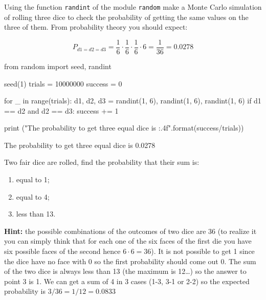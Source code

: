 \begin{question}
Using the function \texttt{randint} of the module \texttt{random} make a Monte Carlo simulation of rolling three dice to check the probability of getting the same values on the three of them.
From probability theory you should expect:

\[P_{d1=d2=d3} = \frac{1}{6}\cdot\frac{1}{6}\cdot\frac{1}{6}\cdot 6 = \frac{1}{36} = 0.0278\]
\end{question}

\cprotEnv\begin{solution}
\begin{ipython}
from random import seed, randint

seed(1)
trials = 10000000
success = 0

for _ in range(trials):
    d1, d2, d3 = randint(1, 6), randint(1, 6), randint(1, 6)
    if d1 == d2 and d2 == d3:
        success += 1

print ("The probability to get three equal dice is {:.4f}".format(success/trials))
\end{ipython}
\begin{ioutput}
The probability to get three equal dice is 0.0278
\end{ioutput}
\end{solution}

\begin{question}
Two fair dice are rolled, find the probability that their sum is:
\begin{enumerate}[start=1]
	\item equal to 1;
	\item equal to 4;
	\item less than 13.
\end{enumerate}
	
\noindent\textbf{Hint:} the possible combinations of the outcomes of two dice are 36 (to realize it you can simply think that for each one of the six faces of the first die you have six possible faces of the second hence $6\cdot 6=36$). It is not possible to get 1 since the dice have no face with 0 so the first probability should come out 0. The sum of the two dice is always less than 13 (the maximum is 12\ldots) so the answer to point 3 is 1. We can get a sum of 4 in 3 cases (1-3, 3-1 or 2-2) so the expected probability is $3/36=1/12=0.0833$
\end{question}

